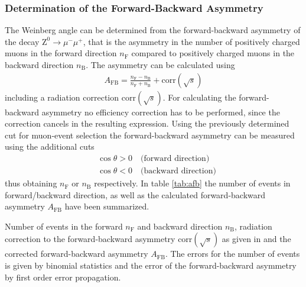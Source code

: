 \documentclass[11pt, a4paper]{article}
\numberwithin{equation}{section}
\begin{document}
\subsubsection{Determination of the Forward-Backward Asymmetry}
The Weinberg angle can be determined from the forward-backward asymmetry of the decay $\mathrm{Z}^0 \rightarrow \mu^- \mu^+$, that is the asymmetry in the number of positively charged muons in the forward direction $n_\mathrm{F}$ compared to positively charged muons in the backward direction $n_\mathrm{B}$.
The asymmetry can be calculated using
\begin{align*}
	A_\mathrm{FB} = \frac{n_\mathrm{F} - n_\mathrm{B}}{n_\mathrm{F} + n_\mathrm{B}} + \mathrm{corr}(\sqrt{s})
\end{align*}
including a radiation correction $\mathrm{corr}(\sqrt{s})$.
For calculating the forward-backward asymmetry no efficiency correction has to be performed, since the correction cancels in the resulting expression.
Using the previously determined cut for muon-event selection the forward-backward asymmetry can be measured using the additional cuts 
\begin{align*}
	&\cos\theta > 0 \quad \text{(forward direction)} \\
	&\cos\theta < 0 \quad \text{(backward direction)}
\end{align*}
thus obtaining $n_\mathrm{F}$ or $n_\mathrm{B}$ respectively.
In table \ref{tab:afb} the number of events in forward/backward direction, as well as the calculated forward-backward asymmetry $A_\mathrm{FB}$ have been summarized.
\begin{table}[h]
	\centering
	
	\caption{Number of events in the forward $n_\mathrm{F}$ and backward direction $n_\mathrm{B}$, radiation correction to the forward-backward asymmetry $\mathrm{corr}(\sqrt{s})$ as given in \cite{anleitung} and the corrected forward-backward asymmetry $A_\mathrm{FB}$. The errors for the number of events is given by binomial statistics and the error of the forward-backward asymmetry by first order error propagation.}
	\label{tab:afb}
\end{table}
\end{document}
